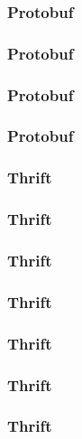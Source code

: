 \documentclass[t]{beamer}
\begin{document}
\begin{frame}
  \frametitle{Protobuf}

  
\end{frame}

\begin{frame}
  \frametitle{Protobuf}

  
\end{frame}

\begin{frame}
  \frametitle{Protobuf}

  
\end{frame}

\begin{frame}
  \frametitle{Protobuf}

  
\end{frame}

\begin{frame}
  \frametitle{Thrift}

  
\end{frame}

\begin{frame}
  \frametitle{Thrift}

  
\end{frame}

\begin{frame}
  \frametitle{Thrift}

  
\end{frame}

\begin{frame}
  \frametitle{Thrift}

  
\end{frame}

\begin{frame}
  \frametitle{Thrift}

  
\end{frame}

\begin{frame}
  \frametitle{Thrift}

  
\end{frame}

\begin{frame}
  \frametitle{Thrift}

  
\end{frame}
\end{document}
